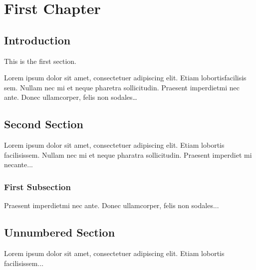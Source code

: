 \documentclass{book}
\begin{document}
\chapter{First Chapter}

\section{Introduction}

This is the first section.

Lorem ipsum dolor sit amet, consectetuer adipiscing elit.
Etiam lobortisfacilisis sem.
Nullam nec mi et neque pharetra sollicitudin.
Praesent imperdietmi nec ante.
Donec ullamcorper, felis non sodales\dots

\section{Second Section}

Lorem ipsum dolor sit amet, consectetuer adipiscing elit.
Etiam lobortis facilisissem.
Nullam nec mi et neque pharatra sollicitudin.
Praesent imperdiet mi necante...

\subsection{First Subsection}
Praesent imperdietmi nec ante.
Donec ullamcorper, felis non sodales...

\section*{Unnumbered Section}
Lorem ipsum dolor sit amet, consectetuer adipiscing elit.
Etiam lobortis facilisissem...
\end{document}
